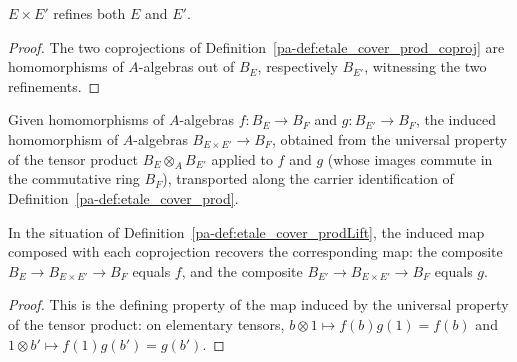 \begin{lemma}
  \label{pa-lem:etale_cover_prod_refines}
  \leanok

  \(E \times E'\) refines both \(E\) and \(E'\).
\end{lemma}
\begin{proof}
  \leanok
  The two coprojections of Definition~\ref{pa-def:etale_cover_prod_coproj} are homomorphisms of
  \(A\)-algebras out of \(B_E\), respectively \(B_{E'}\), witnessing the two refinements.
\end{proof}

\begin{definition}
  \label{pa-def:etale_cover_prodLift}
  \leanok

  Given homomorphisms of \(A\)-algebras \(f \colon B_E \to B_F\) and \(g \colon B_{E'} \to
  B_F\), the induced homomorphism of \(A\)-algebras \(B_{E \times E'} \to B_F\), obtained from
  the universal property of the tensor product \(B_E \otimes_A B_{E'}\) applied to \(f\) and
  \(g\) (whose images commute in the commutative ring \(B_F\)), transported along the carrier
  identification of Definition~\ref{pa-def:etale_cover_prod}.
\end{definition}

\begin{lemma}
  \label{pa-lem:etale_cover_prodLift_comp}
  \leanok

  In the situation of Definition~\ref{pa-def:etale_cover_prodLift}, the induced map composed with
  each coprojection recovers the corresponding map: the composite \(B_E \to B_{E \times E'} \to
  B_F\) equals \(f\), and the composite \(B_{E'} \to B_{E \times E'} \to B_F\) equals \(g\).
\end{lemma}
\begin{proof}
  \leanok
  This is the defining property of the map induced by the universal property of the tensor
  product: on elementary tensors, \(b \otimes 1 \mapsto f(b) g(1) = f(b)\) and
  \(1 \otimes b' \mapsto f(1) g(b') = g(b')\).
\end{proof}


